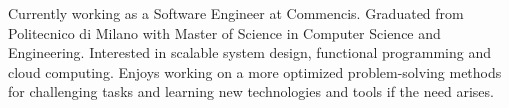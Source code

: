 
\begin{cvparagraph}

Currently working as a Software Engineer at Commencis. 
Graduated from Politecnico di Milano with Master of Science in Computer Science and Engineering. Interested in scalable system design, functional programming and cloud computing. Enjoys working on a more optimized problem-solving methods for challenging tasks and learning new technologies and tools if the need arises. 
\end{cvparagraph}